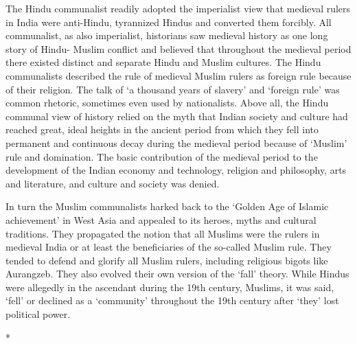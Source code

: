 The Hindu communalist readily adopted the imperialist view that medieval rulers in India were anti-Hindu, tyrannized Hindus and converted them forcibly. All communalist, as also imperialist, historians saw medieval history as one long story of Hindu- Muslim conflict and believed that throughout the medieval period there existed distinct and separate Hindu and Muslim cultures. The Hindu communalists described the rule of medieval Muslim rulers as foreign rule because of their religion. The talk of `a thousand years of slavery' and `foreign rule' was common rhetoric, sometimes even used by nationalists. Above all, the Hindu communal view of history relied on the myth that Indian society and culture had reached great, ideal heights in the ancient period from which they fell into permanent and continuous decay during the medieval period because of `Muslim' rule and domination. The basic contribution of the medieval period to the development of the Indian economy and technology, religion and philosophy, arts and literature, and culture and society was denied. 

In turn the Muslim communalists harked back to the `Golden Age of Islamic achievement' in West Asia and appealed to its heroes, myths and cultural traditions. They propagated the notion that all Muslims were the rulers in medieval India or at least the beneficiaries of the so-called Muslim rule. They tended to defend and glorify all Muslim rulers, including religious bigots like Aurangzeb. They also evolved their own version of the `fall' theory. While Hindus were allegedly in the ascendant during the 19th century, Muslims, it was said, `fell' or declined as a `community' throughout the 19th century after `they' lost political power.

\begin{center}*\end{center}

\paragraph*{}


